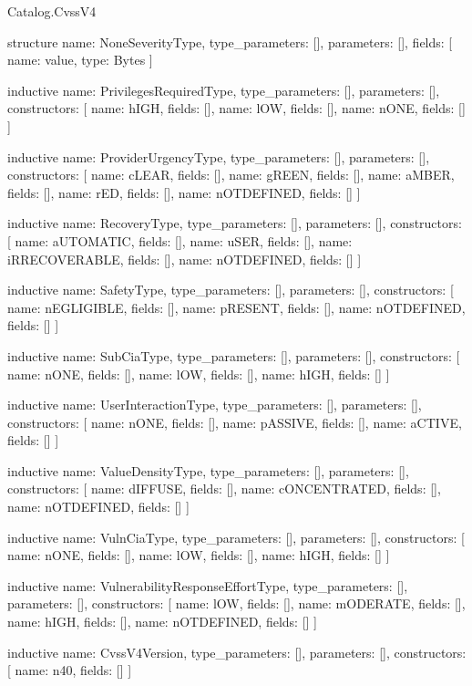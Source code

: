 \begin{lexlean}{Catalog.CvssV4}
\begin{semanticmodule}
structure{
  name: NoneSeverityType,
  type_parameters: [],
  parameters: [],
  fields: [
    {name: value, type: Bytes}
  ]
}

inductive{
  name: PrivilegesRequiredType,
  type_parameters: [],
  parameters: [],
  constructors: [
    {name: hIGH, fields: []},
    {name: lOW, fields: []},
    {name: nONE, fields: []}
  ]
}

inductive{
  name: ProviderUrgencyType,
  type_parameters: [],
  parameters: [],
  constructors: [
    {name: cLEAR, fields: []},
    {name: gREEN, fields: []},
    {name: aMBER, fields: []},
    {name: rED, fields: []},
    {name: nOTDEFINED, fields: []}
  ]
}

inductive{
  name: RecoveryType,
  type_parameters: [],
  parameters: [],
  constructors: [
    {name: aUTOMATIC, fields: []},
    {name: uSER, fields: []},
    {name: iRRECOVERABLE, fields: []},
    {name: nOTDEFINED, fields: []}
  ]
}

inductive{
  name: SafetyType,
  type_parameters: [],
  parameters: [],
  constructors: [
    {name: nEGLIGIBLE, fields: []},
    {name: pRESENT, fields: []},
    {name: nOTDEFINED, fields: []}
  ]
}

inductive{
  name: SubCiaType,
  type_parameters: [],
  parameters: [],
  constructors: [
    {name: nONE, fields: []},
    {name: lOW, fields: []},
    {name: hIGH, fields: []}
  ]
}

inductive{
  name: UserInteractionType,
  type_parameters: [],
  parameters: [],
  constructors: [
    {name: nONE, fields: []},
    {name: pASSIVE, fields: []},
    {name: aCTIVE, fields: []}
  ]
}

inductive{
  name: ValueDensityType,
  type_parameters: [],
  parameters: [],
  constructors: [
    {name: dIFFUSE, fields: []},
    {name: cONCENTRATED, fields: []},
    {name: nOTDEFINED, fields: []}
  ]
}

inductive{
  name: VulnCiaType,
  type_parameters: [],
  parameters: [],
  constructors: [
    {name: nONE, fields: []},
    {name: lOW, fields: []},
    {name: hIGH, fields: []}
  ]
}

inductive{
  name: VulnerabilityResponseEffortType,
  type_parameters: [],
  parameters: [],
  constructors: [
    {name: lOW, fields: []},
    {name: mODERATE, fields: []},
    {name: hIGH, fields: []},
    {name: nOTDEFINED, fields: []}
  ]
}

inductive{
  name: CvssV4Version,
  type_parameters: [],
  parameters: [],
  constructors: [
    {name: n40, fields: []}
  ]
}


\end{semanticmodule}
\end{lexlean}
